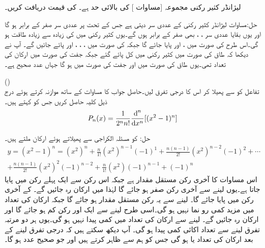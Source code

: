 لیژانڈر کثیر رکنی مجموعہ [مساوات ] کی بالائی حد  ہے۔ کی قیمت دریافت کریں۔

حل:مساوات  لیژانڈر کثیر رکنی کے عددی سر دیتی ہے جس کے تحت  پر عددی سر صفر  کے برابر ہو گا اور یوں بقایا عددی سر ، ،  بھی صفر کے برابر ہوں گے۔یوں کثیر رکنی میں  کی زیادہ سے زیادہ طاقت  ہو گی۔اس طرح  کی صورت میں ،  اور  پایا جائے گا جبکہ  کی صورت میں ، ، ،  اور  پائے جائیں گے۔ آپ نے دیکھا کہ طاق  کی صورت میں کثیر رکنی میں کل  پائے گئے جبکہ جفت  کی صورت میں ارکان کی تعداد  تھی۔یوں طاق  کی صورت میں   اور جفت  کی صورت میں  ہو گا جہاں  عدد صحیح ہے۔ 

\quad ()\\
تفاعل  کو  سے پھیلا کر اس کا  درجی تفرق لیں۔حاصل جواب کا مساوات  کے ساتھ موازنہ کرتے ہوئے درج ذیل کلیہ حاصل کریں جس کو  کہتے ہیں۔
\begin{align}\label{مساوات_بیسل_روڈریگیس_مساوات}
P_n(x)=\frac{1}{2^n n!}\frac{\dif^{\,n}}{\dif x^n}[(x^2-1)^n]
\end{align}

حل: کو مسئلہ الکراجی سے پھیلاتے ہوئے  ارکان ملتے ہیں۔
\begin{multline}\label{مساوات_سوال_بیسل_الکرازی_الف}
y=(x^2-1)^n=(x^2)^n+\frac{n}{1!}(x^2)^{n-1}(-1)^1+\frac{n(n-1)}{2!}(x^2)^{n-2}(-1)^2+\cdots   \\
+\frac{n(n-1)}{2!}(x^2)^2(-1)^{n-2}+\frac{n}{1!}(x^2)(-1)^{n-1}+(-1)^n
\end{multline}
اس مساوات کا آخری رکن مستقل مقدار  ہے جبکہ اس رکن سے ایک پہلے  رکن میں  پایا جاتا ہے۔یوں  لینے سے آخری رکن صفر ہو جائے گا لہٰذا  میں  ارکان رہ جائیں گے۔ کے آخری رکن میں  پایا جائے گا۔ لینے سے یہ رکن مستقل مقدار ہو جائے گا جبکہ ارکان کی تعداد میں مزید کمی رو نما نہیں ہو گی۔اسی طرح  لینے سے ایک اور رکن کم ہو جائے گا اور  ارکان رہ جائیں گے۔ لینے سے ارکان کی تعداد میں کمی پیدا نہیں ہو گی۔یوں ہر دو مرتبہ تفرق لینے سے تعداد اکائی کمی پیدا ہو گی۔ آپ دیکھ سکتے ہیں کہ  درجی تفرق  لینے کے بعد ارکان کی تعداد   یا  ہو گی جس کو ہم  سے ظاہر کرتے ہیں اور جو صحیح عدد ہو گا۔
 
